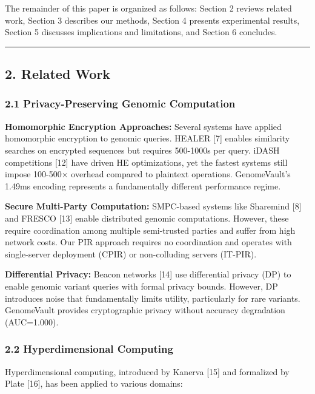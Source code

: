 \documentclass[
  11pt,
]{article}
\begin{document}
The remainder of this paper is organized as follows: Section 2 reviews
related work, Section 3 describes our methods, Section 4 presents
experimental results, Section 5 discusses implications and limitations,
and Section 6 concludes.

\begin{center}\rule{0.5\linewidth}{0.5pt}\end{center}

\subsection{2. Related Work}\label{related-work}

\subsubsection{2.1 Privacy-Preserving Genomic
Computation}\label{privacy-preserving-genomic-computation}

\textbf{Homomorphic Encryption Approaches:} Several systems have applied
homomorphic encryption to genomic queries. HEALER {[}7{]} enables
similarity searches on encrypted sequences but requires 500-1000s per
query. iDASH competitions {[}12{]} have driven HE optimizations, yet the
fastest systems still impose 100-500× overhead compared to plaintext
operations. GenomeVault's 1.49ms encoding represents a fundamentally
different performance regime.

\textbf{Secure Multi-Party Computation:} SMPC-based systems like
Sharemind {[}8{]} and FRESCO {[}13{]} enable distributed genomic
computations. However, these require coordination among multiple
semi-trusted parties and suffer from high network costs. Our PIR
approach requires no coordination and operates with single-server
deployment (CPIR) or non-colluding servers (IT-PIR).

\textbf{Differential Privacy:} Beacon networks {[}14{]} use differential
privacy (DP) to enable genomic variant queries with formal privacy
bounds. However, DP introduces noise that fundamentally limits utility,
particularly for rare variants. GenomeVault provides cryptographic
privacy without accuracy degradation (AUC=1.000).

\subsubsection{2.2 Hyperdimensional
Computing}\label{hyperdimensional-computing}

Hyperdimensional computing, introduced by Kanerva {[}15{]} and
formalized by Plate {[}16{]}, has been applied to various domains:
\end{document}
